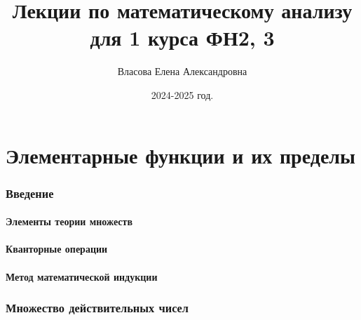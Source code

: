 \documentclass[a4paper,12pt]{article} %
\author{Власова Елена Александровна}
\title{Лекции по математическому анализу для 1 курса ФН2, 3}
\date{2024-2025 год.}
\theoremstyle{remark}
\begin{document}

\maketitle

\newpage
\tableofcontents
\newpage

\part*{Элементарные функции и их пределы}

\section{Введение}
\subsection{Элементы теории множеств}
\subsection{Кванторные операции}
\subsection{Метод математической индукции}

\section{Множество действительных чисел}
\end{document}
